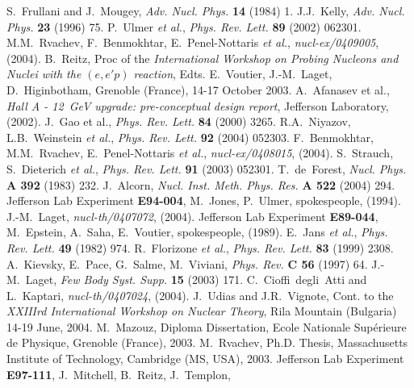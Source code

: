 \documentclass{elsart}
\begin{document}
%
%
\begin{thebibliography}{99}
%
S.~Frullani and J.~Mougey, {\it Adv. Nucl. Phys.} {\bf 14} (1984) 1.
%
J.J.~Kelly, {\it Adv. Nucl. Phys.} {\bf 23} (1996) 75.
%
P.~Ulmer {\it et al.}, {\it Phys. Rev. Lett.} {\bf 89} (2002) 062301.
%
M.M.~Rvachev, F.~Benmokhtar, E.~Penel-Nottaris {\it et al.}, {\it 
nucl-ex/0409005}, (2004). 
%
B.~Reitz, Proc of the {\it International Workshop on Probing Nucleons and 
Nuclei with the $(e,e'p)$ reaction}, Edts. E.~Voutier, J.-M.~Laget, 
D.~Higinbotham, Grenoble (France), 14-17 October 2003.
%
A.~Afanasev {et al.}, {\it Hall A - 12~GeV upgrade: pre-conceptual design 
report}, Jefferson Laboratory, (2002).
%
J.~Gao {et al.}, {\it Phys. Rev. Lett.} {\bf 84} (2000) 3265.
%
R.A.~Niyazov, L.B.~Weinstein {\it et al.}, {\it Phys. Rev. Lett.} {\bf 92} 
(2004) 052303.
%
F.~Benmokhtar, M.M.~Rvachev, E.~Penel-Nottaris {\it et al.}, {\it 
nucl-ex/0408015}, (2004).
%
S.~Strauch, S.~Dieterich {\it et al.}, {\it Phys. Rev. Lett.} {\bf 91} (2003) 
052301.
%
T.~de~Forest, {\it Nucl. Phys.} {\bf A 392} (1983) 232.
%
J.~Alcorn, {\it Nucl. Inst. Meth. Phys. Res.} {\bf A 522} (2004) 294.
%
Jefferson Lab Experiment {\bf E94-004}, M.~Jones, P.~Ulmer, spokespeople, 
(1994).
%
J.-M.~Laget, {\it nucl-th/0407072}, (2004).
%
Jefferson Lab Experiment {\bf E89-044}, M.~Epstein, A.~Saha, E.~Voutier, 
spokespeople, (1989).
%
E.~Jans {\it et al.}, {\it Phys. Rev. Lett.} {\bf 49} (1982) 974. 
%
R.~Florizone {\it et al.}, {\it Phys. Rev. Lett.} {\bf 83} (1999) 2308. 
%
A.~Kievsky, E.~Pace, G.~Salme, M.~Viviani, {\it Phys. Rev.} {\bf C 56} (1997) 64. 
%
J.-M.~Laget, {\it Few Body Syst. Supp.} {\bf 15} (2003) 171.
%
C.~Cioffi~degli~Atti and L.~Kaptari, {\it nucl-th/0407024}, (2004).
%
J.~Udias and J.R.~Vignote, Cont. to the {\it XXIIIrd International Workshop on
Nuclear Theory}, Rila Mountain (Bulgaria) 14-19 June, 2004.
%
M.~Mazouz, Diploma Dissertation, Ecole Nationale Sup\'erieure de Physique,
Grenoble (France), 2003.
%
M.~Rvachev, Ph.D. Thesis, Massachusetts Institute of Technology, Cambridge (MS, 
USA), 2003.
%
Jefferson Lab Experiment {\bf E97-111}, J.~Mitchell, B.~Reitz, J.~Templon,

\end{thebibliography}
\end{document}
